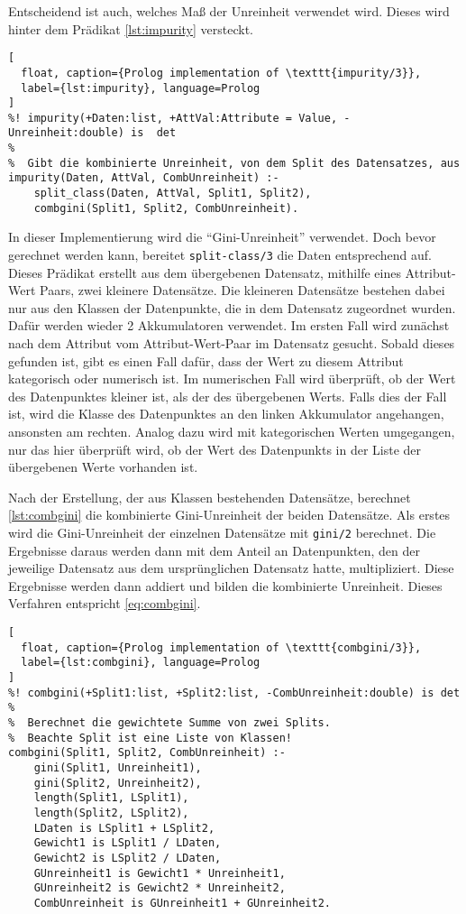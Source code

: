 Entscheidend ist auch, welches Maß der Unreinheit verwendet wird.
Dieses wird hinter dem Prädikat \cref{lst:impurity} versteckt.
\begin{lstlisting}[
  float, caption={Prolog implementation of \texttt{impurity/3}},
  label={lst:impurity}, language=Prolog
]
%! impurity(+Daten:list, +AttVal:Attribute = Value, -Unreinheit:double) is  det
%
%  Gibt die kombinierte Unreinheit, von dem Split des Datensatzes, aus
impurity(Daten, AttVal, CombUnreinheit) :-
    split_class(Daten, AttVal, Split1, Split2),
    combgini(Split1, Split2, CombUnreinheit).
\end{lstlisting}
In dieser Implementierung wird die \enquote{Gini-Unreinheit} verwendet.
Doch bevor gerechnet werden kann, bereitet \texttt{split-class/3} die Daten entsprechend auf.
Dieses Prädikat erstellt aus dem übergebenen Datensatz, mithilfe eines Attribut-Wert Paars, zwei kleinere Datensätze.
Die kleineren Datensätze bestehen dabei nur aus den Klassen der Datenpunkte, die in dem Datensatz zugeordnet wurden.
Dafür werden wieder 2 Akkumulatoren verwendet. Im ersten Fall wird zunächst nach dem Attribut vom Attribut-Wert-Paar
im Datensatz gesucht. Sobald dieses gefunden ist, gibt es einen Fall dafür, dass der Wert zu diesem
Attribut kategorisch oder numerisch ist. Im numerischen Fall wird überprüft, ob der Wert des Datenpunktes kleiner ist,
als der des übergebenen Werts. Falls dies der Fall ist, wird die Klasse des Datenpunktes an den linken Akkumulator angehangen,
ansonsten am rechten. Analog dazu wird mit kategorischen Werten umgegangen, nur das hier überprüft wird, ob
der Wert des Datenpunkts in der Liste der übergebenen Werte vorhanden ist.

Nach der Erstellung, der aus Klassen bestehenden Datensätze, berechnet \cref{lst:combgini}
die kombinierte Gini-Unreinheit der beiden Datensätze. Als erstes wird die Gini-Unreinheit der
einzelnen Datensätze mit \texttt{gini/2} berechnet. Die Ergebnisse daraus werden dann mit dem Anteil
an Datenpunkten, den der jeweilige Datensatz aus dem ursprünglichen Datensatz hatte, multipliziert.
Diese Ergebnisse werden dann addiert und bilden die kombinierte Unreinheit.
Dieses Verfahren entspricht \cref{eq:combgini}.

\begin{lstlisting}[
  float, caption={Prolog implementation of \texttt{combgini/3}},
  label={lst:combgini}, language=Prolog
]
%! combgini(+Split1:list, +Split2:list, -CombUnreinheit:double) is det
%
%  Berechnet die gewichtete Summe von zwei Splits.
%  Beachte Split ist eine Liste von Klassen!
combgini(Split1, Split2, CombUnreinheit) :-
    gini(Split1, Unreinheit1),
    gini(Split2, Unreinheit2),
    length(Split1, LSplit1),
    length(Split2, LSplit2),
    LDaten is LSplit1 + LSplit2,
    Gewicht1 is LSplit1 / LDaten,
    Gewicht2 is LSplit2 / LDaten,
    GUnreinheit1 is Gewicht1 * Unreinheit1,
    GUnreinheit2 is Gewicht2 * Unreinheit2,
    CombUnreinheit is GUnreinheit1 + GUnreinheit2.
\end{lstlisting}

